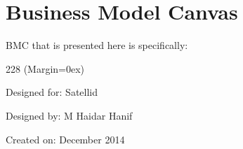 \chapter{Business Model Canvas}
\label{apx:bmc}

\ac{BMC} that is presented here is specifically:


\begin{dinglist}{228}
\ListProperties(Margin=0ex)
\item Designed for: Satellid
\item Designed by: M Haidar Hanif
\item Created on: December 2014
\end{dinglist}











